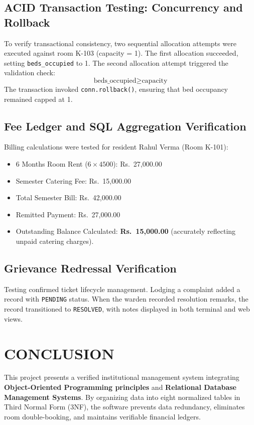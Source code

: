 \documentclass[12pt,a4paper]{report}
\newcommand{\rupee}{Rs.~}
\begin{document}
\section{ACID Transaction Testing: Concurrency and Rollback}
To verify transactional consistency, two sequential allocation attempts were executed against room K-103 (capacity = 1). The first allocation succeeded, setting \texttt{beds\_occupied} to 1. The second allocation attempt triggered the validation check:
$$\text{beds\_occupied} \ge \text{capacity}$$
The transaction invoked \texttt{conn.rollback()}, ensuring that bed occupancy remained capped at 1.

\section{Fee Ledger and SQL Aggregation Verification}
Billing calculations were tested for resident Rahul Verma (Room K-101):
\begin{itemize}
\item 6 Months Room Rent ($6 \times 4500$): \rupee 27,000.00
\item Semester Catering Fee: \rupee 15,000.00
\item Total Semester Bill: \rupee 42,000.00
\item Remitted Payment: \rupee 27,000.00
\item Outstanding Balance Calculated: \textbf{\rupee 15,000.00} (accurately reflecting unpaid catering charges).
\end{itemize}

\section{Grievance Redressal Verification}
Testing confirmed ticket lifecycle management. Lodging a complaint added a record with \texttt{PENDING} status. When the warden recorded resolution remarks, the record transitioned to \texttt{RESOLVED}, with notes displayed in both terminal and web views.

\newpage

\chapter{CONCLUSION}

This project presents a verified institutional management system integrating \textbf{Object-Oriented Programming principles} and \textbf{Relational Database Management Systems}. By organizing data into eight normalized tables in Third Normal Form (3NF), the software prevents data redundancy, eliminates room double-booking, and maintains verifiable financial ledgers.
\end{document}
